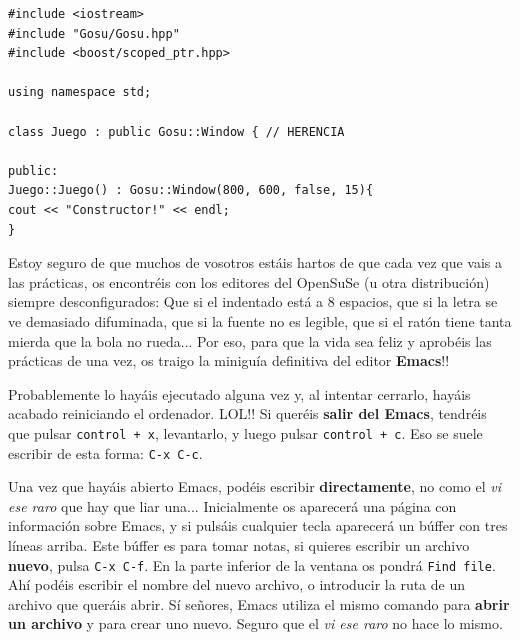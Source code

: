 \documentclass{article}
\begin{document}
\begin{lstlisting}[style=C]
#include <iostream>
#include "Gosu/Gosu.hpp"
#include <boost/scoped_ptr.hpp>

using namespace std;

class Juego : public Gosu::Window { // HERENCIA

public:
Juego::Juego() : Gosu::Window(800, 600, false, 15){
cout << "Constructor!" << endl;
}
\end{lstlisting}



\pagebreak

Estoy seguro de que muchos de vosotros estáis hartos de que cada vez que vais a las prácticas, os encontréis con los editores del OpenSuSe (u otra distribución) siempre desconfigurados: Que si el indentado está a 8 espacios, que si la letra se ve demasiado difuminada, que si la fuente no es legible, que si el ratón tiene tanta mierda que la bola no rueda... Por eso, para que la vida sea feliz y aprobéis las prácticas de una vez, os traigo la miniguía definitiva del editor \textbf{Emacs}!! 

Probablemente lo hayáis ejecutado alguna vez y, al intentar cerrarlo, hayáis acabado reiniciando el ordenador. LOL!! Si queréis \textbf{salir del Emacs}, tendréis que pulsar \texttt{control + x}, levantarlo, y luego pulsar \texttt{control + c}. Eso se suele escribir de esta forma: \texttt{C-x C-c}. 

Una vez que hayáis abierto Emacs, podéis escribir \textbf{directamente}, no como el \textit{vi ese raro} que hay que liar una... Inicialmente os aparecerá una página con información sobre Emacs, y si pulsáis cualquier tecla aparecerá un búffer con tres líneas arriba. Este búffer es para tomar notas, si quieres escribir un archivo \textbf{nuevo}, pulsa \texttt{C-x C-f}. En la parte inferior de la ventana os pondrá \texttt{Find file}. Ahí podéis escribir el nombre del nuevo archivo, o introducir la ruta de un archivo que queráis abrir. Sí señores, Emacs utiliza el mismo comando para \textbf{abrir un archivo} y para crear uno nuevo. Seguro que el \textit{vi ese raro} no hace lo mismo.
\end{document}
